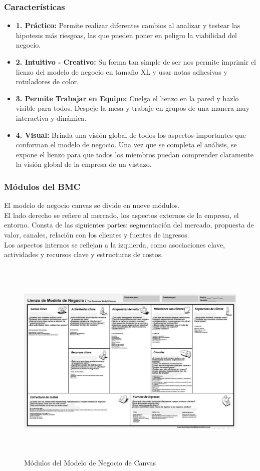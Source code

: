 \documentclass[preprint,12pt]{elsarticle}
\begin{document}
	\subsubsection{\textbf{Características}}
	\begin{itemize}
	\item{\textbf{1. Práctico: }}Permite realizar diferentes cambios al analizar y testear las hipotesis más riesgoas, las que pueden poner en peligro la viabilidad del negocio.
	\item {\textbf{2. Intuitivo - Creativo: }}Su forma tan simple de ser nos permite imprimir el lienzo del modelo de negocio en tamaño XL y usar notas adhesivas y rotuladores de color.
	\item {\textbf{3. Permite Trabajar en Equipo: }}Cuelga el lienzo en la pared y hazlo visible para todos. Despeje la mesa y trabaje en grupos de una manera muy interactiva y dinámica.
	\item {\textbf{4. Visual: }}Brinda una visión global de todos los aspectos importantes que conforman el modelo de negocio. Una vez que se completa el análisis, se expone el lienzo para que todos los miembros puedan comprender claramente la visión global de la empresa de un vistazo.
	\end{itemize}

	\subsubsection{\textbf{Módulos del BMC}}
El modelo de negocio canvas se divide en nueve módulos. \\El lado derecho se refiere al mercado, los aspectos externos de la empresa, el entorno. Consta de las siguientes partes: segmentación del mercado, propuesta de valor, canales, relación con los clientes y fuentes de ingresos.\\ Los aspectos internos se reflejan a la izquierda, como asociaciones clave, actividades y recursos clave y estructuras de costos.

\begin{figure}[htb]
		\begin{center}
			\includegraphics[height=10cm]{./IMAGENES/modeloCanvas2} 
			\caption{Módulos del Modelo de Negocio de Canvas} 
		\end{center}
	\end{figure}
\end{document}
